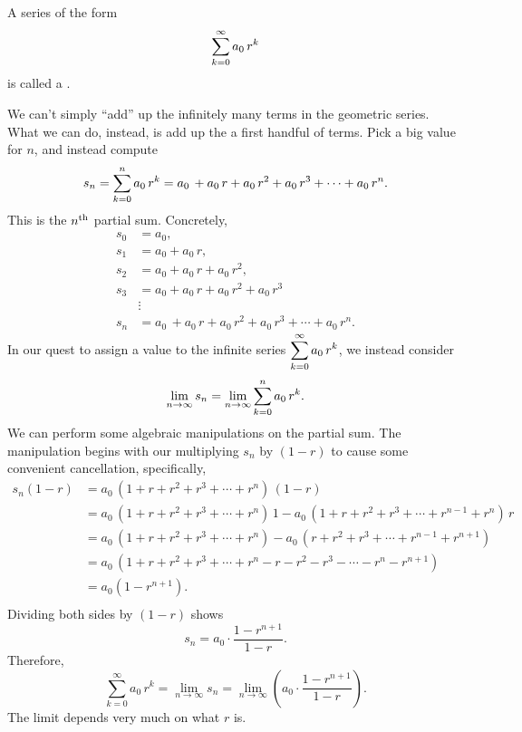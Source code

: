 
\begin{definition}
A series of the form
$$
\displaystyle\sum_{k=0}^\infty a_0 \, r^k
$$
is called a .
\end{definition}

We can't simply ``add'' up the infinitely many terms in the geometric
series.  What we can do, instead, is add up the a first handful of
terms.  Pick a big value for $n$, and instead compute
$$
s_n = \displaystyle\sum_{k=0}^n a_0\, r^k = a_0\, +a_0\, r+a_0\, r^2+a_0\, r^3+\cdots+a_0\, r^n.
$$
This is the $n^{\mbox{\scriptsize th}}$ partial sum.  Concretely,
\begin{align*}
s_0 &= a_0, \\
s_1 &= a_0 + a_0\, r, \\
s_2 &= a_0 + a_0\, r + a_0 \, r^2, \\
s_3 &= a_0 + a_0\, r + a_0 \, r^2 + a_0 \, r^3 \\
& \vdots \\
s_n &= a_0\, +a_0\, r+a_0\, r^2+a_0\, r^3+\cdots+a_0\, r^n.
\end{align*}
In our quest to assign a value to the infinite series
$\displaystyle\sum_{k=0}^\infty a_0 \, r^k$, we instead consider
$$
\lim_{n \to \infty} s_n = \lim_{n \to \infty} \displaystyle\sum_{k=0}^n a_0 \, r^k.
$$
We can perform some algebraic manipulations on the partial sum.
The manipulation begins with our multiplying $s_n$ by $(1-r)$ to cause some
convenient cancellation, specifically,
\begin{align*}
  s_n(1-r) &= a_0\, (1+r+r^2+r^3 + \cdots + r^n) \, (1-r) \\
  &=a_0\, (1+r+r^2+r^3+\cdots+r^n) \, 1 - a_0\, (1+r+r^2+r^3+\cdots+r^{n-1}+r^n)\, r \\
  &=a_0\, (1+r+r^2+r^3+\cdots+r^n) - a_0\, (r+r^2+r^3+\cdots+r^{n-1}+r^{n+1}) \\
  &=a_0 \, (1+r+r^2+r^3+\cdots+r^n-r-r^2-r^3-\cdots-r^n-r^{n+1}) \\
  &=a_0(1-r^{n+1}). \\
\end{align*}
Dividing both sides by $(1-r)$ shows
$$
s_n = a_0 \cdot \frac{1 - r^{n+1}}{1-r}.
$$
Therefore,
$$
\sum_{k=0}^\infty a_0 \, r^k = \lim_{n \to \infty} s_n = \lim_{n \to \infty} \left( a_0 \cdot \frac{1 - r^{n+1}}{1-r} \right).
$$
The limit depends very much on what $r$ is.

